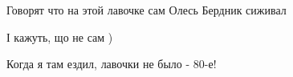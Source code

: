  
 
 
 
 

Говорят что на этой лавочке сам Олесь Бердник сиживал

І кажуть, що не сам )

Когда я там ездил, лавочки не было - 80-е!
